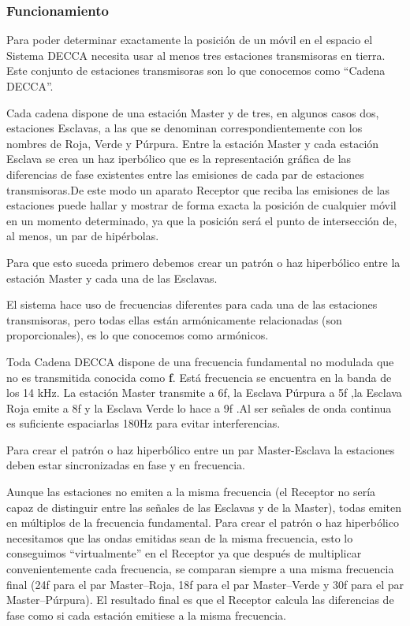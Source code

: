 \subsubsection{ Funcionamiento}


Para poder determinar exactamente la posici\'on de un m\'ovil en el espacio el Sistema DECCA necesita usar al menos tres estaciones transmisoras en tierra. Este conjunto de estaciones transmisoras son lo que conocemos como ``Cadena DECCA''.

Cada cadena dispone de una estaci\'on Master y de tres, en algunos casos dos, estaciones Esclavas, a las que se denominan correspondientemente con los nombres de Roja, Verde y P\'urpura. Entre la estaci\'on Master y cada estaci\'on Esclava se crea un haz iperb\'olico que es la representaci\'on gr\'afica de las diferencias de fase existentes entre las emisiones de cada par de estaciones transmisoras.De este modo un aparato Receptor que reciba las emisiones de las estaciones puede hallar y mostrar de forma exacta la posici\'on de cualquier m\'ovil en un momento determinado, ya que la posici\'on ser\'a el punto de intersecci\'on de, al menos, un par de hip\'erbolas.

Para que esto suceda primero debemos crear un patr\'on o haz hiperb\'olico entre la estaci\'on Master y cada una de las Esclavas.

El sistema hace uso de frecuencias diferentes para cada una de las estaciones transmisoras, pero todas ellas est\'an arm\'onicamente relacionadas (son proporcionales), es lo que conocemos como arm\'onicos.

Toda Cadena DECCA dispone de una frecuencia fundamental no modulada que no es transmitida conocida como \textbf{f}. Est\'a frecuencia se encuentra en la banda de los 14 kHz. La estaci\'on Master transmite a 6f, la Esclava P\'urpura a 5f ,la Esclava Roja emite a 8f y la Esclava Verde lo hace a 9f .Al ser se\~nales de onda continua es suficiente espaciarlas 180Hz para evitar interferencias.

Para crear el patr\'on o haz hiperb\'olico entre un par Master-Esclava la estaciones deben estar sincronizadas en fase y en frecuencia.

Aunque las estaciones no emiten a la misma frecuencia (el Receptor no ser\'ia capaz de distinguir entre las se\~nales de las Esclavas y de la Master), todas emiten en m\'ultiplos de la frecuencia fundamental. Para crear el patr\'on o haz hiperb\'olico necesitamos que las ondas emitidas sean de la misma frecuencia, esto lo conseguimos “virtualmente” en el Receptor ya que despu\'es de multiplicar convenientemente cada frecuencia, se comparan siempre a una misma frecuencia final (24f para el par Master–Roja, 18f para el par Master–Verde y 30f para el par Master–P\'urpura). El resultado final es que el Receptor calcula las diferencias de fase como si cada estaci\'on emitiese a la misma frecuencia.

